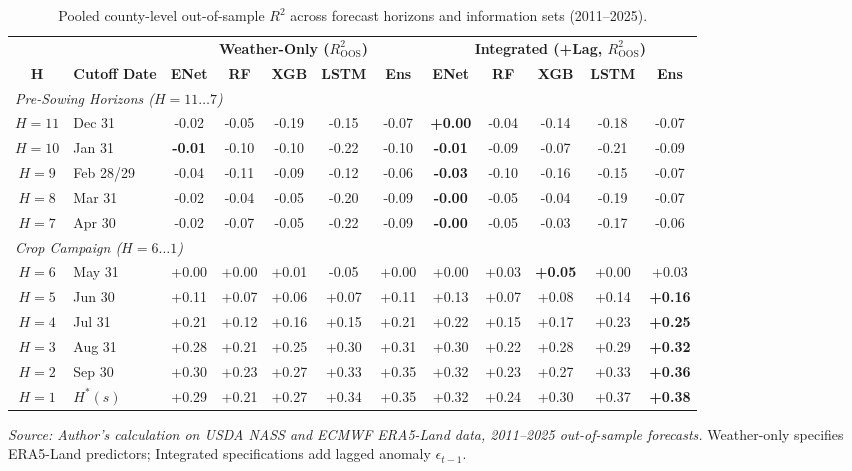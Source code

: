 \begin{table}[htbp]
\centering
\singlespacing
\footnotesize
\setlength{\tabcolsep}{3.0pt}
\renewcommand{\arraystretch}{1.12}
\caption{Pooled county-level out-of-sample $R^2$ across forecast horizons and information sets (2011--2025).}
\label{tab:horizon_performance}
\begin{tabular*}{\textwidth}{@{\extracolsep{\fill}}c l c c c c c c c c c c @{}}
\toprule
& & \multicolumn{5}{c}{\textbf{Weather-Only ($R^2_{\mathrm{OOS}}$)}} & \multicolumn{5}{c}{\textbf{Integrated (+Lag, $R^2_{\mathrm{OOS}}$)}} \\
\cmidrule(lr){3-7}\cmidrule(lr){8-12}
\textbf{H} & \textbf{Cutoff Date} & \textbf{ENet} & \textbf{RF} & \textbf{XGB} & \textbf{LSTM} & \textbf{Ens} & \textbf{ENet} & \textbf{RF} & \textbf{XGB} & \textbf{LSTM} & \textbf{Ens} \\
\midrule
\multicolumn{12}{l}{\textit{Pre-Sowing Horizons ($H=11\dots7$)}} \\
$H=11$ & Dec 31 & -0.02 & -0.05 & -0.19 & -0.15 & -0.07 & \textbf{+0.00} & -0.04 & -0.14 & -0.18 & -0.07 \\
$H=10$ & Jan 31 & \textbf{-0.01} & -0.10 & -0.10 & -0.22 & -0.10 & \textbf{-0.01} & -0.09 & -0.07 & -0.21 & -0.09 \\
$H=9$ & Feb 28/29 & -0.04 & -0.11 & -0.09 & -0.12 & -0.06 & \textbf{-0.03} & -0.10 & -0.16 & -0.15 & -0.07 \\
$H=8$ & Mar 31 & -0.02 & -0.04 & -0.05 & -0.20 & -0.09 & \textbf{-0.00} & -0.05 & -0.04 & -0.19 & -0.07 \\
$H=7$ & Apr 30 & -0.02 & -0.07 & -0.05 & -0.22 & -0.09 & \textbf{-0.00} & -0.05 & -0.03 & -0.17 & -0.06 \\
\midrule
\multicolumn{12}{l}{\textit{Crop Campaign ($H=6\dots1$)}} \\
$H=6$ & May 31 & +0.00 & +0.00 & +0.01 & -0.05 & +0.00 & +0.00 & +0.03 & \textbf{+0.05} & +0.00 & +0.03 \\
$H=5$ & Jun 30 & +0.11 & +0.07 & +0.06 & +0.07 & +0.11 & +0.13 & +0.07 & +0.08 & +0.14 & \textbf{+0.16} \\
$H=4$ & Jul 31 & +0.21 & +0.12 & +0.16 & +0.15 & +0.21 & +0.22 & +0.15 & +0.17 & +0.23 & \textbf{+0.25} \\
$H=3$ & Aug 31 & +0.28 & +0.21 & +0.25 & +0.30 & +0.31 & +0.30 & +0.22 & +0.28 & +0.29 & \textbf{+0.32} \\
$H=2$ & Sep 30 & +0.30 & +0.23 & +0.27 & +0.33 & +0.35 & +0.32 & +0.23 & +0.27 & +0.33 & \textbf{+0.36} \\
$H=1$ & $H^*(s)$ & +0.29 & +0.21 & +0.27 & +0.34 & +0.35 & +0.32 & +0.24 & +0.30 & +0.37 & \textbf{+0.38} \\
\bottomrule
\end{tabular*}
\vspace{0.2em}
{\footnotesize\textit{Source: Author's calculation on USDA NASS and ECMWF ERA5-Land data, 2011--2025 out-of-sample forecasts.} Weather-only specifies ERA5-Land predictors; Integrated specifications add lagged anomaly $\epsilon_{t-1}$.}
\end{table}
